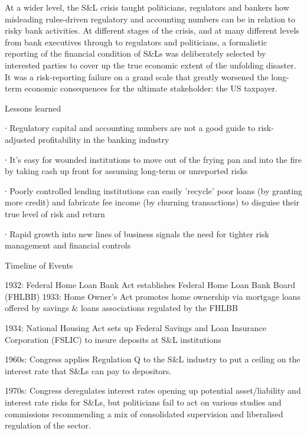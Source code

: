 At a wider level, the S&L crisis taught politicians, regulators and bankers how misleading rules-driven regulatory and accounting numbers can be in relation to risky bank activities. At different stages of the crisis, and at many different levels from bank executives through to regulators and politicians, a formalistic reporting of the financial condition of S&Ls was deliberately selected by interested parties to cover up the true economic extent of the unfolding disaster. It was a risk-reporting failure on a grand scale that greatly worsened the long-term economic consequences for the ultimate stakeholder: the US taxpayer.



 






Lessons learned

∙        Regulatory capital and accounting numbers are not a good guide to risk-adjusted profitability in the banking industry

∙        It's easy for wounded institutions to move out of the frying pan and into the fire by taking cash up front for assuming long-term or unreported risks

∙        Poorly controlled lending institutions can easily 'recycle' poor loans (by granting more credit) and fabricate fee income (by churning transactions) to disguise their true level of risk and return

∙        Rapid growth into new lines of business signals the need for tighter risk management and financial controls

 






Timeline of Events

1932: Federal Home Loan Bank Act establishes Federal Home Loan Bank Board (FHLBB) 1933: Home Owner's Act promotes home ownership via mortgage loans offered by savings & loans associations regulated by the FHLBB

1934: National Housing Act sets up Federal Savings and Loan Insurance Corporation (FSLIC) to insure deposits at S&L institutions

1960s: Congress applies Regulation Q to the S&L industry to put a ceiling on the interest rate that S&Ls can pay to depositors.

1970s: Congress deregulates interest rates opening up potential asset/liability and interest rate risks for S&Ls, but politicians fail to act on various studies and commissions recommending a mix of consolidated supervision and liberalised regulation of the sector.

